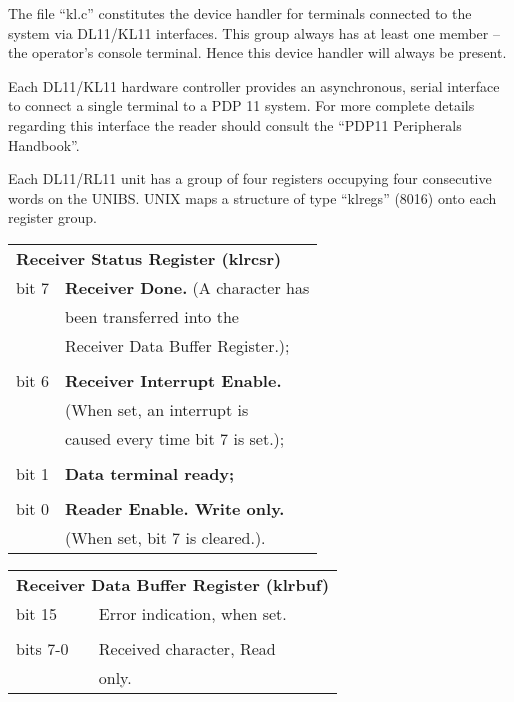 
The file ``kl.c'' constitutes the device
handler for terminals connected to the
system via DL11/KL11 interfaces. This
group always has at least one member -- the operator's console terminal. Hence
this device handler will always be
present.

Each DL11/KL11 hardware controller provides an asynchronous, serial interface
to connect a single terminal to a PDP
11 system. For more complete details
regarding this interface the reader
should consult the ``PDP11 Peripherals
Handbook''.


Each DL11/RL11 unit has a group of four
registers occupying four consecutive
words on the UNIBS. UNIX maps a
structure of type ``klregs'' (8016) onto
each register group.

\noindent\begin{tabular}{ll}\\
\multicolumn{2}{l}{\bf Receiver Status Register (klrcsr)} \\
bit 7 & {\bf Receiver Done.} (A character has\\
      & been transferred into the\\
      & Receiver Data Buffer Register.);\\
\\
bit 6 & {\bf Receiver Interrupt Enable.}\\
      & (When set, an interrupt is\\
      & caused every time bit 7 is set.);\\
\\
bit 1 & {\bf Data terminal ready;}\\
\\
bit 0 & {\bf Reader Enable. Write only.}\\
      & (When set, bit 7 is cleared.).\\
\end{tabular}

\noindent\begin{tabular}{ll}\\
\multicolumn{2}{l}{\bf Receiver Data Buffer Register (klrbuf)} \\
bit 15 & Error indication, when set.\\
\\
bits 7-0 & Received character, Read\\
         & only.\\
\end{tabular}

